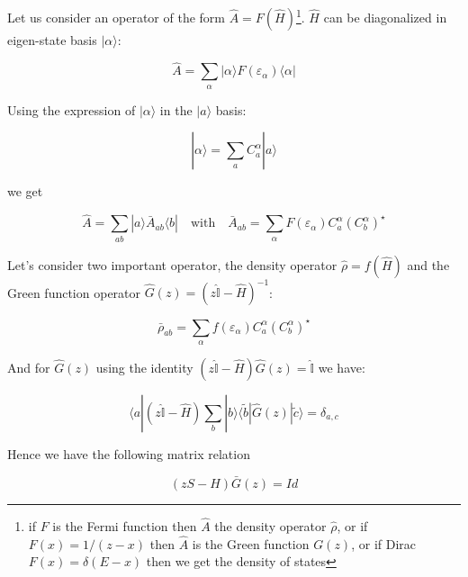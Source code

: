 \documentclass{article}
\newcommand{\bra}[1]{\langle #1|}
\newcommand{\ket}[1]{|#1\rangle}
\newcommand{\op}[1]{\hat{#1}}
\begin{document}

\smallskip
\noindent
Let us consider an operator of the form
$\op{A}=F(\op{H})$\footnote{if $F$ is the Fermi function then
 $\op{A}$ the density operator $\op{\rho}$, or if $F(x)=1/(z-x)$ then  $\op{A}$ is the Green function $G(z)$, or if  Dirac $F(x)=\delta(E-x)$ then we get the density of states}.  $\op{H}$ can be diagonalized in eigen-state basis $\ket{\alpha}$:

\[ \op{A}=\sum_{\alpha} \ket{\alpha} F(\varepsilon_{\alpha}) \bra{\alpha} \]

\noindent
Using the expression of $\ket{\alpha}$ in the $\ket{a}$ basis:

\[\ket{\alpha}=\sum_a C_a^{\alpha}\ket{a}  \]
\noindent


\noindent
we get


\[ \op{A}= \sum_{ab} \ket{a}\bar{A}_{ab} \bra{b} \quad \text{with} \quad 
\bar{A}_{ab}=
\sum_{\alpha} F(\varepsilon_{\alpha})C_a^{\alpha}(C_{b}^{\alpha})^{\star} \]

\noindent
Let's consider two important operator, the density operator $\op{\rho}=f(\op{H})$ and the Green function operator $\op{G}(z)=(z\op{\mathbb{I}}-\op{H})^{-1}$:

\noindent
\[ \bar{\rho}_{ab}=
\sum_{\alpha} f(\varepsilon_{\alpha})C_a^{\alpha}(C_{b}^{\alpha})^{\star} \]

\noindent
And for $\op{G}(z)$ using the identity $(z\op{\mathbb{I}}-\op{H})\op{G}(z)=\op{\mathbb{I}}$ we have:

\[ \bra{a}(z\op{\mathbb{I}}-\op{H})\sum_b \ket{b}\bra{\tilde{b}}\op{G}(z) \ket{\tilde{c}}=\delta_{a,c}\]

\noindent
Hence we have the following matrix relation

\[(zS-H)\bar{G}(z)=Id\]



\noindent


\end{document}
